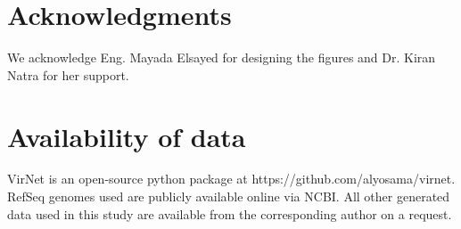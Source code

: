 \documentclass[conference]{IEEEtran}
\begin{document}
\section*{Acknowledgments}

We acknowledge Eng. Mayada Elsayed for designing the figures and Dr. Kiran Natra for her support.  


\section*{Availability of data}

VirNet is an open-source python package at https://github.com/alyosama/virnet. 
RefSeq genomes used are publicly available online via NCBI. All other generated data used in this study are available from the corresponding author on a request. 




\end{document}
